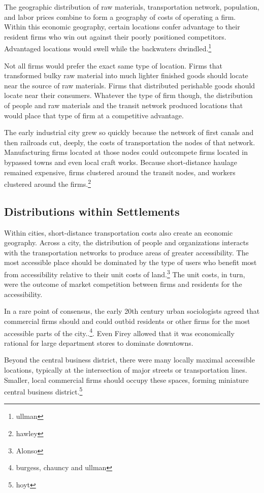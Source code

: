 The geographic distribution of raw materials, transportation network,
population, and labor prices combine to form a geography of costs of
operating a firm. Within this economic geography, certain locations
confer advantage to their resident firms who win out against their
poorly positioned competitors. Advantaged locations would swell while
the backwaters dwindled.\footnote{ullman}

Not all firms would prefer the exact same type of location. Firms that
transformed bulky raw material into much lighter finished goods should
locate near the source of raw materials. Firms that distributed
perishable goods should locate near their consumers. Whatever the type
of firm though, the distribution of people and raw materials and the
transit network produced locations that would place that type of firm
at a competitive advantage.

The early industrial city grew so quickly because the network of first
canals and then railroads cut, deeply, the costs of transportation the
nodes of that network. Manufacturing firms located at those nodes
could outcompete firms located in bypassed towns and even local craft
works. Because short-distance haulage remained expensive, firms
clustered around the transit nodes, and workers clustered around the
firms.\footnote{hawley}

\subsection*{Distributions within Settlements}
Within cities, short-distance transportation costs also create an economic
geography. Across a city, the distribution of people and organizations
interacts with the transportation networks to produce areas of greater
accessibility. The most accessible place should be dominated by the
type of users who benefit most from accessibility relative to their
unit costs of land.\footnote{Alonso} The unit costs, in turn, were the
outcome of market competition between firms and residents for the
accessibility.

In a rare point of consensus, the early 20th century urban
sociologists agreed that commercial firms should and could outbid
residents or other firms for the most accessible parts of the
city..\footnote{burgess, chauncy and ullman}. Even Firey allowed that
it was economically rational for large department stores to dominate
downtowns.

Beyond the central business district, there were many locally maximal
accessible locations, typically at the intersection of major streets
or transportation lines. Smaller, local commercial firms should occupy
these spaces, forming miniature central business district.\footnote{hoyt}

